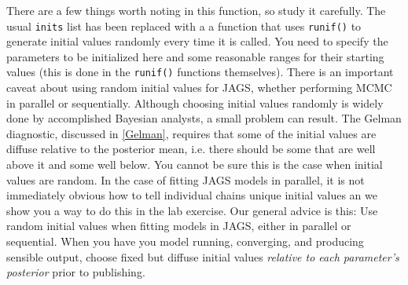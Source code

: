 \documentclass[12pt,english]{article}
\begin{document}
There are a few things worth noting in this function, so study it carefully. The usual \texttt{inits} list has been replaced with a a function that uses \texttt{runif()} to generate initial values randomly every time it is called. You need to specify the parameters to be initialized here and some reasonable ranges for their starting values (this is done in the \texttt{runif()} functions themselves). There is an important caveat about using random initial values for JAGS, whether performing MCMC in parallel or sequentially.  Although choosing initial values randomly is widely done by accomplished Bayesian analysts, a small problem can result. The Gelman diagnostic, discussed in \ref{Gelman}, requires that some of the initial values are diffuse relative to the posterior mean, i.e. there should be some that are well above it and some well below.  You cannot be sure this is the case when initial values are random. In the case of fitting JAGS models in parallel, it is not immediately obvious how to tell individual chains unique initial values an we show you a way to do this in the lab exercise. Our general advice is this: Use random initial values when fitting models in JAGS, either in parallel or sequential. When you have you model running, converging, and producing sensible output, choose fixed but diffuse initial values \textit{relative to each parameter's posterior} prior to publishing.
\end{document}
